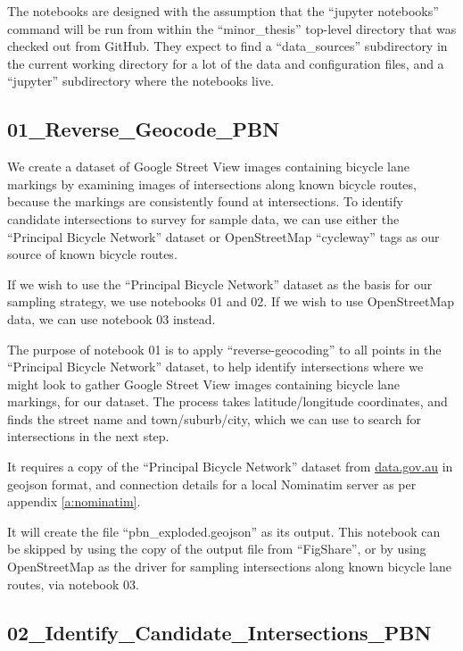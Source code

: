 \documentclass[11pt,twoside]{report}
\begin{document}
The notebooks are designed with the assumption that the ``jupyter notebooks'' command will be run from within the ``minor\_thesis'' top-level directory that was checked out from GitHub.  They expect to find a ``data\_sources'' subdirectory in the current working directory for a lot of the data and configuration files, and a ``jupyter'' subdirectory where the notebooks live.

\subsection{01\_Reverse\_Geocode\_PBN}
\label{aj:01}

We create a dataset of Google Street View images containing bicycle lane markings by examining images of intersections along known bicycle routes, because the markings are consistently found at intersections.  To identify candidate intersections to survey for sample data, we can use either the ``Principal Bicycle Network'' dataset or OpenStreetMap ``cycleway'' tags as our source of known bicycle routes.

If we wish to use the ``Principal Bicycle Network'' dataset as the basis for our sampling strategy, we use notebooks 01 and 02.  If we wish to use OpenStreetMap data, we can use notebook 03 instead.

The purpose of notebook 01 is to apply ``reverse-geocoding'' to all points in the ``Principal Bicycle Network'' dataset, to help identify intersections where we might look to gather Google Street View images containing bicycle lane markings, for our dataset.  The process takes latitude/longitude coordinates, and finds the street name and town/suburb/city, which we can use to search for intersections in the next step.

It requires a copy of the ``Principal Bicycle Network'' dataset from \url{data.gov.au} in geojson format, and connection details for a local Nominatim server as per appendix \ref{a:nominatim}.

It will create the file ``pbn\_exploded.geojson'' as its output.  This notebook can be skipped by using the copy of the output file from ``FigShare'', or by using OpenStreetMap as the driver for sampling intersections along known bicycle lane routes, via notebook 03.


\subsection{02\_Identify\_Candidate\_Intersections\_PBN}
\label{aj02}
\end{document}

